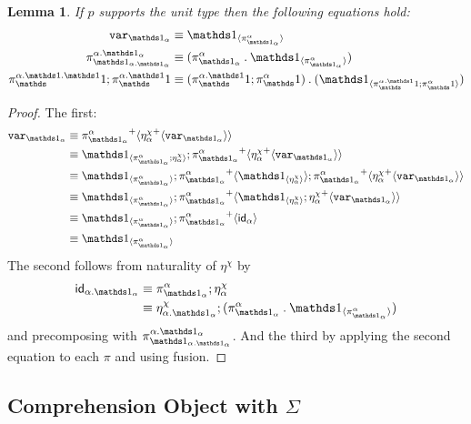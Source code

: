 \documentclass[10pt]{article}
\newtheorem{lemma}{Lemma}
\theoremstyle{definition}
\newcommand{\id}{\mathsf{id}}
\newcommand\bdot[0]{\mathbin{.}}
\newcommand\ApPlus[2]{\ensuremath{{#1}^+ \langle #2 \rangle }}
\begin{document}
\begin{lemma}
If $p$ supports the unit type then the following equations hold:
\begin{align}
\var{\One_\alpha} &\equiv \ApOne{\pi^\alpha_{\One_\alpha}} \\
\pi^{\alpha.\One_\alpha}_{\One_{\alpha.\One_\alpha}} &\equiv (\pi^\alpha_{\One_\alpha} \bdot \ApOne{\pi^\alpha_{\One_\alpha}}) \\
\pi^{\alpha.\One.\One}_\One;\pi^{\alpha.\One}_\One &\equiv (\pi^{\alpha.\One}_\One;\pi^{\alpha}_\One) \bdot (\ApOne{\pi^{\alpha.\One}_\One;\pi^{\alpha}_\One})
\end{align}
\end{lemma}
\begin{proof}
The first:
\begin{align*}
\var{\One_\alpha} 
&\equiv \ApPlus{\pi^\alpha_{\One_\alpha}}{\ApPlus{\eta^\chi_\alpha}{\var{\One_\alpha}}} \\
&\equiv \ApOne{\pi^\alpha_{\One_\alpha} ; \eta^\chi_\alpha};\ApPlus{\pi^\alpha_{\One_\alpha}}{\ApPlus{\eta^\chi_\alpha}{\var{\One_\alpha}}} \\
&\equiv \ApOne{\pi^\alpha_{\One_\alpha}};\ApPlus{\pi^\alpha_{\One_\alpha}}{\ApOne{\eta^\chi_\alpha}};\ApPlus{\pi^\alpha_{\One_\alpha}}{\ApPlus{\eta^\chi_\alpha}{\var{\One_\alpha}}} \\
&\equiv \ApOne{\pi^\alpha_{\One_\alpha}};\ApPlus{\pi^\alpha_{\One_\alpha}}{\ApOne{\eta^\chi_\alpha};\ApPlus{\eta^\chi_\alpha}{\var{\One_\alpha}}} \\
&\equiv \ApOne{\pi^\alpha_{\One_\alpha}};\ApPlus{\pi^\alpha_{\One_\alpha}}{\id_{\alpha}} \\
&\equiv \ApOne{\pi^\alpha_{\One_\alpha}}
\end{align*}
The second follows from naturality of $\eta^\chi$ by
\begin{align*}
\id_{\alpha.\One_\alpha} 
&\equiv \pi^\alpha_{\One_\alpha} ; \eta^\chi_\alpha \\
&\equiv \eta^\chi_{\alpha.\One_\alpha} ; (\pi^\alpha_{\One_\alpha} \bdot \ApOne{\pi^\alpha_{\One_\alpha}})
\end{align*}
and precomposing with $\pi^{\alpha.\One_\alpha}_{\One_{\alpha.\One_\alpha}}$.
And the third by applying the second equation to each $\pi$ and using fusion.
\end{proof}

\subsection{Comprehension Object with $\Sigma$}
\newcommand\mtt[1]{\mathtt{#1}}
\newcommand\contract[1]{\ensuremath{\mathtt{contract}_{#1}}}
\newcommand\fibpair[1]{\ensuremath{\mathtt{fibpair}_{#1}}}
\newcommand\pair[1]{\ensuremath{\mathtt{pair}_{#1}}}
\newcommand\tsplit[1]{\ensuremath{\mathtt{split}_{#1}}}
\end{document}
